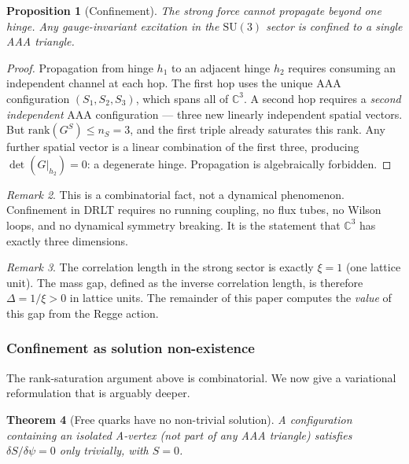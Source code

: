 \documentclass[12pt]{article}
\newtheorem{theorem}{Theorem}[section]
\newtheorem{proposition}[theorem]{Proposition}
\theoremstyle{remark}
\newtheorem{remark}[theorem]{Remark}
\theoremstyle{definition}
\newcommand{\CC}{\mathbb{C}}
\begin{document}
\begin{proposition}[Confinement]
\label{prop:confinement}
The strong force cannot propagate beyond one hinge. Any gauge-invariant
excitation in the $\mathrm{SU}(3)$ sector is confined to a single AAA
triangle.
\end{proposition}

\begin{proof}
Propagation from hinge $h_1$ to an adjacent hinge $h_2$ requires
consuming an independent channel at each hop. The first hop uses the
unique AAA configuration $(S_1, S_2, S_3)$, which spans all of
$\CC^3$. A second hop requires a \emph{second independent} AAA
configuration --- three new linearly independent spatial vectors. But
$\mathrm{rank}(G^S) \leq n_S = 3$, and the first triple already
saturates this rank. Any further spatial vector is a linear combination
of the first three, producing $\det(G|_{h_2}) = 0$: a degenerate hinge.
Propagation is algebraically forbidden.
\end{proof}

\begin{remark}
This is a combinatorial fact, not a dynamical phenomenon. Confinement
in DRLT requires no running coupling, no flux tubes, no Wilson loops,
and no dynamical symmetry breaking. It is the statement that
$\CC^3$ has exactly three dimensions.
\end{remark}

\begin{remark}
The correlation length in the strong sector is exactly $\xi = 1$ (one
lattice unit). The mass gap, defined as the inverse correlation length,
is therefore $\Delta = 1/\xi > 0$ in lattice units. The remainder of
this paper computes the \emph{value} of this gap from the Regge action.
\end{remark}

\subsubsection{Confinement as solution non-existence}
\label{sec:confinement_solution}

The rank-saturation argument above is combinatorial.  We now give a variational reformulation that is arguably deeper.

\begin{theorem}[Free quarks have no non-trivial solution]
\label{thm:confinement_variational}
A configuration containing an isolated A-vertex (not part of any AAA triangle) satisfies $\delta S/\delta\psi = 0$ only trivially, with $S = 0$.
\end{theorem}
\end{document}
